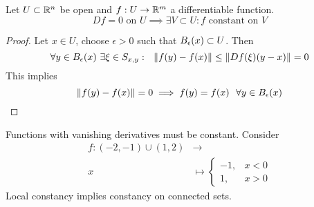 \documentclass[../../script.tex]{subfiles}
\begin{document}
\begin{cor}
    Let $U \subset \mathbb{R}^n$ be open and $f: U \rightarrow \mathbb{R}^m$ a differentiable function.
    \[
        Df = 0 \text{ on } U \implies \exists V \subset U: f \text{ constant on } V
    \]
\end{cor}
\begin{proof}
    Let $x \in U$, choose $\epsilon > 0$ such that $B_{\epsilon}(x) \subset U$. Then 
    \begin{equation}
        \forall y \in B_{\epsilon}(x) ~\exists \xi \in S_{{x,y}}: ~~\norm{f(y) - f(x)} \le \norm{Df(\xi)(y - x)} = 0
    \end{equation}
    This implies 
    \begin{equation}
        \norm{f(y) - f(x)} = 0 \implies f(y) = f(x) ~~\forall y \in B_{\epsilon}(x)
    \end{equation}
\end{proof}

\begin{rem}
    Functions with vanishing derivatives must be constant. Consider 
    \begin{align*}
        f: (-2, -1) \cup (1, 2) &\longrightarrow \\
        x &\longmapsto \begin{cases}
            -1, & x < 0 \\
            1, & x > 0
        \end{cases}
    \end{align*}
    Local constancy implies constancy on connected sets.
\end{rem}
\end{document}
